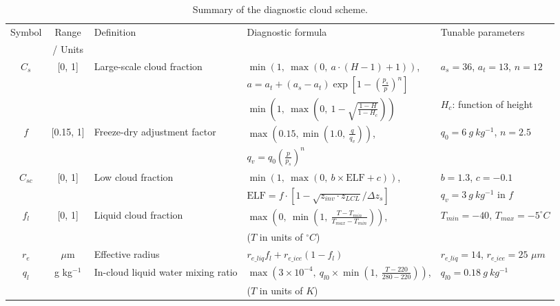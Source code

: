 \begin{table}
	\caption{Summary of the diagnostic cloud scheme.}
	\vspace{0.5em}
	\centering
	\renewcommand{\arraystretch}{1.5}
	\begin{tabular}{c c p{6cm} p{7cm} l} 
		\hline
		\multirow{2}{*}{Symbol} & Range  & \multirow{2}{*}{Definition} & \multirow{2}{*}{Diagnostic formula} & \multirow{2}{*}{Tunable parameters} \\
		& / Units & & & \\
		\hline %
		\multirow{3}{*}{$C_s$} & \multirow{3}{*}{[0, 1]} & \multirow{3}{*}{Large-scale cloud fraction} & $\min\left(1, ~\max \left(0, ~a \cdot (H-1) + 1 \right)\right)$,&  \multirow{2}{*}{$a_s=36$, $a_t=13$, $n=12$} \\
		& &  &	$a=a_t + (a_s-a_t)\exp{\left[1-\left( \frac{p_s}{p} \right)^{n} \right]}$& \\ \cline{4-5}
		& &  &	$\min\left(1, ~\max \left(0, ~1-\sqrt{\frac{1-H}{1-H_{c}}} \right)\right)$ & $H_c$: function of height  \\
		\hline
		\multirow{2}{*}{$f$}  & \multirow{2}{*}{[0.15, 1]} & \multirow{2}{*}{Freeze-dry adjustment factor} & $\max \left(0.15, \min \left(1.0, ~\frac{q}{q_{v}}\right)\right)$, & \multirow{2}{*}{$q_0=6 ~g~kg^{-1}$, $n=2.5$} \\
		& & & $q_{v}= q_0\left(\frac{p}{p_s}\right)^n$ & \\
		\hline 
		\multirow{2}{*}{$C_{sc}$} & \multirow{2}{*}{[0, 1]} & \multirow{2}{*}{Low cloud fraction} & $\min(1, ~\max(0, ~b\times \text{ELF} +c))$, & $b=1.3$, $c= -0.1$  \\
		& & &  $\text{ELF}=f \cdot\left[1-\sqrt{z_{inv} \cdot z_{LCL}}/{\Delta z_{s}}\right]$  & $q_v=3~g~kg^{-1}$ in $f$ \\
		\hline 
		\multirow{2}{*}{$f_l$} & \multirow{2}{*}{[0, 1]}  & \multirow{2}{*}{Liquid cloud fraction} & $\max\left(0, ~\min\left(1, ~\frac{T-T_{min}}{T_{max}-T_{min}} \right)\right)$, & \multirow{2}{*}{$T_{min}=-40$, $T_{max}=-5^\circ C$} \\
		& & & ($T$ in units of $^\circ C$) & \\
		$r_e$ & $\mu$m &	Effective radius & $r_{e\_liq}f_l + r_{e\_ice}(1-f_l)$ & $r_{e\_liq}=14$, $r_{e\_ice}=25$ $\mu m$ \\
		\hline
		\multirow{2}{*}{$q_l$} & \multirow{2}{*}{g kg$^{-1}$} & \multirow{2}{*}{In-cloud liquid water mixing ratio} & $\max\left(3\times 10^{-4}, ~q_{l0}\times \min\left(1, ~\frac{T-220}{280-220}\right)\right)$, &
		\multirow{2}{*}{$q_{l0}=0.18~g~kg^{-1}$} \\
		& & & ($T$ in units of $K$) & \\
		\hline
	\end{tabular}
	\label{tab:cld_scheme_summary}
\end{table}
